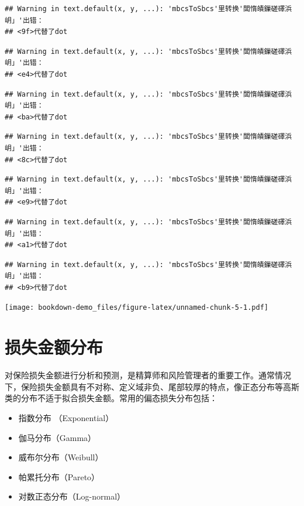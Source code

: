 \documentclass[
]{book}
\begin{document}
\begin{verbatim}
## Warning in text.default(x, y, ...): 'mbcsToSbcs'里转换'闆惰皟鏁磋礋浜岄」'出错：
## <9f>代替了dot
\end{verbatim}

\begin{verbatim}
## Warning in text.default(x, y, ...): 'mbcsToSbcs'里转换'闆惰皟鏁磋礋浜岄」'出错：
## <e4>代替了dot
\end{verbatim}

\begin{verbatim}
## Warning in text.default(x, y, ...): 'mbcsToSbcs'里转换'闆惰皟鏁磋礋浜岄」'出错：
## <ba>代替了dot
\end{verbatim}

\begin{verbatim}
## Warning in text.default(x, y, ...): 'mbcsToSbcs'里转换'闆惰皟鏁磋礋浜岄」'出错：
## <8c>代替了dot
\end{verbatim}

\begin{verbatim}
## Warning in text.default(x, y, ...): 'mbcsToSbcs'里转换'闆惰皟鏁磋礋浜岄」'出错：
## <e9>代替了dot
\end{verbatim}

\begin{verbatim}
## Warning in text.default(x, y, ...): 'mbcsToSbcs'里转换'闆惰皟鏁磋礋浜岄」'出错：
## <a1>代替了dot
\end{verbatim}

\begin{verbatim}
## Warning in text.default(x, y, ...): 'mbcsToSbcs'里转换'闆惰皟鏁磋礋浜岄」'出错：
## <b9>代替了dot
\end{verbatim}

\texttt{[image: bookdown-demo\_files/figure-latex/unnamed-chunk-5-1.pdf]}

\hypertarget{ux635fux5931ux91d1ux989dux5206ux5e03}{%
\section{损失金额分布}\label{ux635fux5931ux91d1ux989dux5206ux5e03}}

对保险损失金额进行分析和预测，是精算师和风险管理者的重要工作。通常情况下，保险损失金额具有不对称、定义域非负、尾部较厚的特点，像正态分布等高斯类的分布不适于拟合损失金额。常用的偏态损失分布包括：

\begin{itemize}
\item
  指数分布 （Exponential）
\item
  伽马分布（Gamma）
\item
  威布尔分布（Weibull）
\item
  帕累托分布（Pareto）
\item
  对数正态分布（Log-normal）
\end{itemize}
\end{document}
